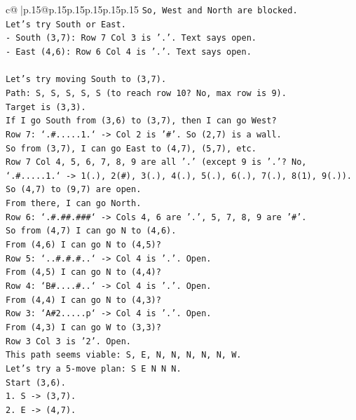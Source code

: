 \documentclass{article}
\begin{document}
{\begin{supertabular}{c@{$\;$}|p{.15\linewidth}@{}p{.15\linewidth}p{.15\linewidth}p{.15\linewidth}p{.15\linewidth}p{.15\linewidth}}
{{{\texttt{So, West and North are blocked.} \\
\texttt{Let's try South or East.} \\
\texttt{{-} South (3,7): Row 7 Col 3 is '.'. Text says open.} \\
\texttt{{-} East (4,6): Row 6 Col 4 is '.'. Text says open.} \\
\\ 
\texttt{Let's try moving South to (3,7).} \\
\texttt{Path: S, S, S, S, S (to reach row 10? No, max row is 9).} \\
\texttt{Target is (3,3).} \\
\texttt{If I go South from (3,6) to (3,7), then I can go West?} \\
\texttt{Row 7: `.\#.....1.` {-}> Col 2 is '\#'. So (2,7) is a wall.} \\
\texttt{So from (3,7), I can go East to (4,7), (5,7), etc.} \\
\texttt{Row 7 Col 4, 5, 6, 7, 8, 9 are all '.' (except 9 is '.'? No, `.\#.....1.` {-}> 1(.), 2(\#), 3(.), 4(.), 5(.), 6(.), 7(.), 8(1), 9(.)).} \\
\texttt{So (4,7) to (9,7) are open.} \\
\texttt{From there, I can go North.} \\
\texttt{Row 6: `.\#.\#\#.\#\#\#` {-}> Cols 4, 6 are '.', 5, 7, 8, 9 are '\#'.} \\
\texttt{So from (4,7) I can go N to (4,6).} \\
\texttt{From (4,6) I can go N to (4,5)?} \\
\texttt{Row 5: `..\#.\#.\#..` {-}> Col 4 is '.'. Open.} \\
\texttt{From (4,5) I can go N to (4,4)?} \\
\texttt{Row 4: `B\#....\#..` {-}> Col 4 is '.'. Open.} \\
\texttt{From (4,4) I can go N to (4,3)?} \\
\texttt{Row 3: `A\#2.....p` {-}> Col 4 is '.'. Open.} \\
\texttt{From (4,3) I can go W to (3,3)?} \\
\texttt{Row 3 Col 3 is '2'. Open.} \\
\texttt{This path seems viable: S, E, N, N, N, N, N, W.} \\
\texttt{Let's try a 5{-}move plan: S E N N N.} \\
\texttt{Start (3,6).} \\
\texttt{1. S {-}> (3,7).} \\
\texttt{2. E {-}> (4,7).} \\
}}}
\end{supertabular}}
\end{document}
